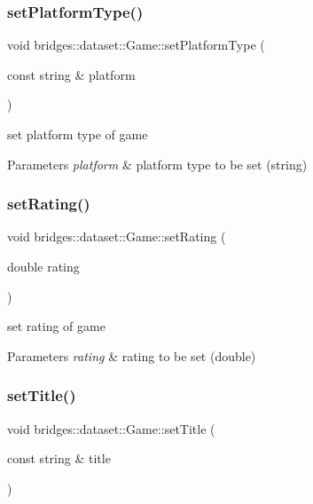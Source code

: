 \subsubsection{\texorpdfstring{set\+Platform\+Type()}{setPlatformType()}}
{\footnotesize\ttfamily void bridges\+::dataset\+::\+Game\+::set\+Platform\+Type (\begin{DoxyParamCaption}\item[{const string \&}]{platform }\end{DoxyParamCaption})\hspace{0.3cm}{\ttfamily [inline]}}

set platform type of game 
\begin{DoxyParams}{Parameters}
{\em platform} & platform type to be set (string) \\
\hline
\end{DoxyParams}
\mbox{\label{classbridges_1_1dataset_1_1_game_a95038f714770bb2e12aeed91614264db}} 
\subsubsection{\texorpdfstring{set\+Rating()}{setRating()}}
{\footnotesize\ttfamily void bridges\+::dataset\+::\+Game\+::set\+Rating (\begin{DoxyParamCaption}\item[{double}]{rating }\end{DoxyParamCaption})\hspace{0.3cm}{\ttfamily [inline]}}

set rating of game 
\begin{DoxyParams}{Parameters}
{\em rating} & rating to be set (double) \\
\hline
\end{DoxyParams}
\mbox{\label{classbridges_1_1dataset_1_1_game_a8f8f6e03458c05e20b0b446f9ddd211a}} 
\subsubsection{\texorpdfstring{set\+Title()}{setTitle()}}
{\footnotesize\ttfamily void bridges\+::dataset\+::\+Game\+::set\+Title (\begin{DoxyParamCaption}\item[{const string \&}]{title }\end{DoxyParamCaption})\hspace{0.3cm}{\ttfamily [inline]}}


